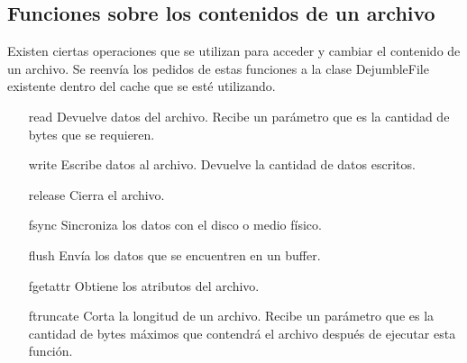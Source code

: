 \subsection{Funciones  sobre los contenidos de un archivo}

Existen ciertas operaciones que se utilizan para acceder y cambiar el contenido de un archivo. Se reenvía los pedidos de estas funciones a la clase DejumbleFile existente dentro del cache que se esté utilizando.

\begin{itemize}
\item[read] Devuelve datos del archivo. Recibe un parámetro que es la cantidad de bytes que se requieren.
\item[write] Escribe datos al archivo. Devuelve la cantidad de datos escritos.
\item[release] Cierra el archivo.
\item[fsync] Sincroniza los datos con el disco o medio físico.
\item[flush] Envía los datos que se encuentren en un buffer.
\item[fgetattr] Obtiene los atributos del archivo.
\item[ftruncate] Corta la longitud de un archivo. Recibe un parámetro que es la cantidad de bytes máximos que contendrá el archivo después de ejecutar esta función.
\end{itemize}




